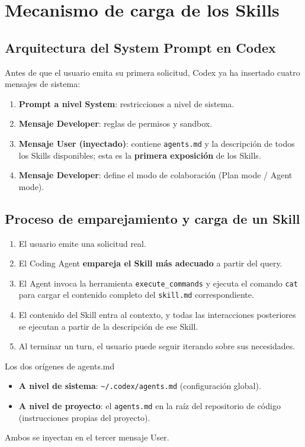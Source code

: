 \section{Mecanismo de carga de los Skills}

\subsection{Arquitectura del System Prompt en Codex}

Antes de que el usuario emita su primera solicitud, Codex ya ha insertado cuatro mensajes de sistema:

\begin{enumerate}
    \item \textbf{Prompt a nivel System}: restricciones a nivel de sistema.
    \item \textbf{Mensaje Developer}: reglas de permisos y sandbox.
    \item \textbf{Mensaje User (inyectado)}: contiene \texttt{agents.md} y la descripción de todos los Skills disponibles; esta es la \textbf{primera exposición} de los Skills.
    \item \textbf{Mensaje Developer}: define el modo de colaboración (Plan mode / Agent mode).
\end{enumerate}

\subsection{Proceso de emparejamiento y carga de un Skill}

\begin{enumerate}
    \item El usuario emite una solicitud real.
    \item El Coding Agent \textbf{empareja el Skill más adecuado} a partir del query.
    \item El Agent invoca la herramienta \texttt{execute\_commands} y ejecuta el comando \texttt{cat} para cargar el contenido completo del \texttt{skill.md} correspondiente.
    \item El contenido del Skill entra al contexto, y todas las interacciones posteriores se ejecutan a partir de la descripción de ese Skill.
    \item Al terminar un turn, el usuario puede seguir iterando sobre sus necesidades.
\end{enumerate}

\begin{knowledgebox}{Los dos orígenes de agents.md}
\begin{itemize}
    \item \textbf{A nivel de sistema}: \texttt{\~{}/.codex/agents.md} (configuración global).
    \item \textbf{A nivel de proyecto}: el \texttt{agents.md} en la raíz del repositorio de código (instrucciones propias del proyecto).
\end{itemize}
Ambos se inyectan en el tercer mensaje User.
\end{knowledgebox}

